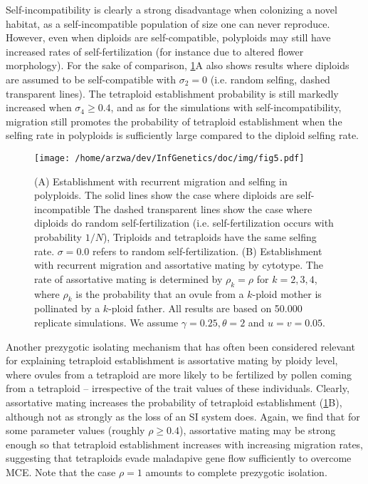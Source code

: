 \documentclass[12pt,a4paper]{article}
\begin{document}
Self-incompatibility is clearly a strong disadvantage when colonizing a novel
habitat, as a self-incompatible population of size one can never reproduce.
However, even when diploids are self-compatible, polyploids may still have
increased rates of self-fertilization (for instance due to altered flower
morphology).
For the sake of comparison, \cref{fig:selfing}A also shows results where
diploids are assumed to be self-compatible with $\sigma_2=0$ (i.e. random
selfing, dashed transparent lines).
The tetraploid establishment probability is still markedly increased when
$\sigma_4 \ge 0.4$, and as for the simulations with self-incompatibility,
migration still promotes the probability of tetraploid establishment when the
selfing rate in polyploids is sufficiently large compared to the diploid
selfing rate.

\begin{figure}
\centering
\texttt{[image: /home/arzwa/dev/InfGenetics/doc/img/fig5.pdf]} 
    \caption{
    (A) Establishment with recurrent migration and selfing in polyploids. 
    The solid lines show the case where diploids are self-incompatible 
    The dashed transparent lines show the case where diploids do random
    self-fertilization (i.e. self-fertilization occurs with probability $1/N$),
    Triploids and tetraploids have the same selfing rate. 
    $\sigma=0.0$ refers to random self-fertilization.  
    (B) Establishment with recurrent migration and assortative mating by
    cytotype. The rate of assortative mating is determined by $\rho_k = \rho$
    for $k=2,3,4$, where $\rho_k$ is the probability that an ovule from a
    $k$-ploid mother is pollinated by a $k$-ploid father.
    All results are based on 50.000 replicate simulations.  We assume
    $\gamma=0.25, \theta=2$ and $u=v=0.05$.  \label{fig:selfing}}
\end{figure}

Another prezygotic isolating mechanism that has often been considered relevant
for explaining tetraploid establishment is assortative mating by ploidy level,
where ovules from a tetraploid are more likely to be fertilized by
pollen coming from a tetraploid -- irrespective of the trait values of these
individuals.
Clearly, assortative mating increases the probability of tetraploid
establishment (\cref{fig:selfing}B), although not as strongly as the loss of an SI
system does.
Again, we find that for some parameter values (roughly $\rho \ge 0.4$),
assortative mating may be strong enough so that tetraploid establishment
increases with increasing migration rates, suggesting that tetraploids evade
maladapive gene flow sufficiently to overcome MCE.
Note that the case $\rho = 1$ amounts to complete prezygotic isolation.
\end{document}
